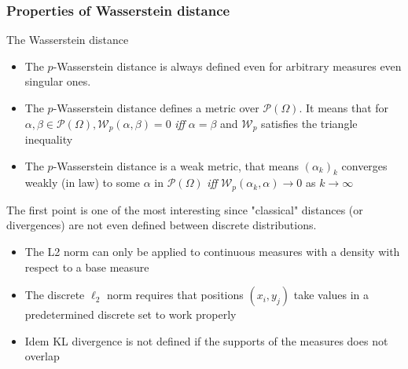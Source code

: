 \documentclass[french,9pt]{beamer}
\begin{document}
\begin{frame}
  \frametitle{Properties of Wasserstein distance}
  
  \begin{block}{The Wasserstein distance}
  \begin{itemize}
  \item The $p$-Wasserstein distance is always defined even for arbitrary measures even singular ones.
  \item The $p$-Wasserstein distance defines a metric over $\mathcal{P}(\Omega)$. It means that for $\alpha, \beta \in \mathcal{P}(\Omega), \mathcal{W}_{p}(\alpha,\beta)=0$ \textit{iff} $\alpha=\beta$ and $ \mathcal{W}_{p}$ satisfies the triangle inequality
  \item The $p$-Wasserstein distance is a weak metric, that means $(\alpha_{k})_{k}$ converges weakly (in law) to some $\alpha$ in $\mathcal{P}(\Omega)$ \textit{iff} $ \mathcal{W}_{p}(\alpha_{k},\alpha) \rightarrow 0$ as $k \rightarrow \infty$
  \end{itemize}
  \end{block}
  
  \pause
  
  The first point is one of the most interesting since "classical" distances (or divergences) are not even defined between discrete distributions. 
  
  \begin{itemize}
  \item The L2 norm can only be applied to continuous measures with a density with respect to a base measure
  \item The discrete $\ell_{2}$ norm requires that positions $(x_{i}, y_{j})$ take values in a predetermined discrete set to work properly 
  \item Idem KL divergence is not defined if the supports of the measures does not overlap
  \end{itemize}


\end{frame}

\end{document}
